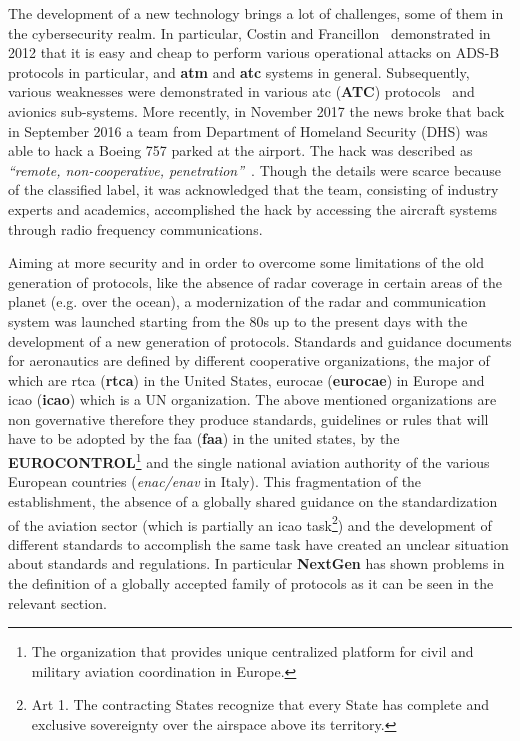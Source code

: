 \documentclass[../main.tex]{subfiles}
\begin{document}
The development of a new technology brings a lot of challenges, some of them in the cybersecurity realm.
In particular, Costin and Francillon~\cite{costin2012ghost} demonstrated in 2012
that it is easy and cheap to perform various operational attacks on ADS-B
protocols in particular, and \textbf{\acrshort{atm}} and \textbf{\acrshort{atc}}
systems in general.
Subsequently, various weaknesses were demonstrated in various \acrlong{atc} (\textbf{ATC}) protocols~\cite{renderman,teso} and avionics sub-systems.
More recently, in November 2017 the news broke that back in September 2016 a
team from Department of Homeland Security (DHS) was able to hack a Boeing 757
parked at the airport. The hack was described as \emph{``remote,
non-cooperative, penetration''}~\cite{news-boeinghack-cso}.
Though the details were scarce because of the classified label, it was
acknowledged that the team, consisting of industry experts and academics,
accomplished the hack by accessing the aircraft systems through radio frequency
communications.

Aiming at more security and in order to overcome some limitations of the old
generation of protocols, like the absence of radar coverage in certain areas of
the planet (e.g. over the ocean), a modernization of the radar and communication
system was launched starting from the 80s up to the present days with the
development of a new generation of protocols. Standards and guidance documents
for aeronautics are defined by different cooperative organizations, the major of
which are \acrlong{rtca} (\textbf{\acrshort{rtca}}) in the United States,
\acrlong{eurocae} (\textbf{\acrshort{eurocae}}) in Europe and \acrlong{icao}
(\textbf{\acrshort{icao}}) which is a UN organization. The above mentioned
organizations are non governative therefore they produce standards, guidelines
or rules that will have to be adopted by the \acrlong{faa}
(\textbf{\acrshort{faa}}) in the united states, by the
\textbf{EUROCONTROL}\footnote{The organization that provides unique centralized
platform for civil and military aviation coordination in Europe.} and the single
national aviation authority of the various European countries
(\textit{\acrshort{enac}/\acrshort{enav}} in Italy). This fragmentation of the
establishment, the absence of a globally shared guidance on the standardization
of the aviation sector (which is partially an \acrshort{icao} task\footnote{Art
1. The contracting States recognize that every  State has complete and exclusive
sovereignty over the airspace above its territory.\cite{icao7300}}) and the
development of different standards to accomplish the same task have created an
unclear situation about standards and regulations. In particular
\textbf{NextGen} has shown problems in the definition of a globally accepted
family of protocols as it can be seen in the relevant section.
\end{document}
